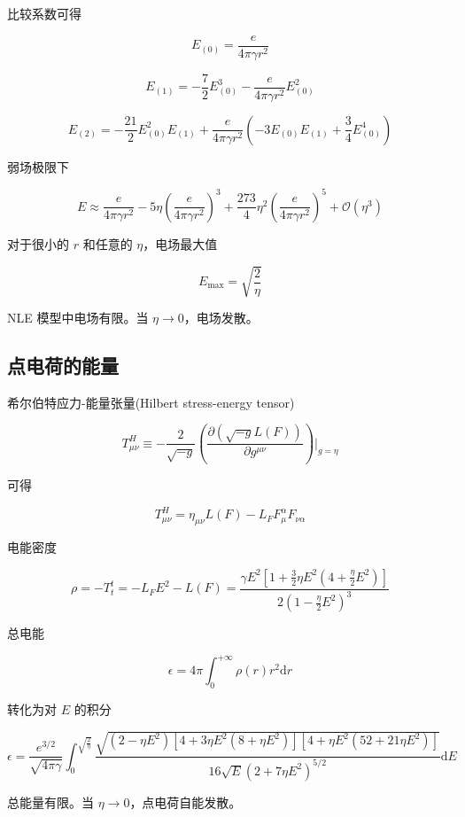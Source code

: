 \documentclass[9pt, dvipsnames]{beamer} %
\begin{document}
\begin{frame}
    比较系数可得
    
    $$
    E_{(0)}
    =\frac{e }{4\pi\gamma r^2 }
    $$
    
    $$
    E_{(1)} 
    =-\frac{7 }{2 } E_{(0)}^3 - \frac{e }{4\pi \gamma r^2 } E_{(0)}^2
    $$
    
    $$
    E_{(2)}
    =-\frac{21 }{2 } E_{(0)}^2 E_{(1)} + \frac{e }{4\pi\gamma r^2 } \left(-3E_{(0)}E_{(1)} + \frac{3 }{4 } E_{(0)}^4 \right)
    $$
    
    弱场极限下
    
    $$
    E
    \approx \frac{e }{4\pi\gamma r^2 } - 5\eta\left(\frac{e }{4\pi\gamma r^2 }  \right)^3 + \frac{273 }{4 } \eta^2\left(\frac{e }{4\pi\gamma r^2 }  \right)^5 + \mathcal{O}\left(\eta^3 \right)
    $$
    
    对于很小的 $r$ 和任意的 $\eta$，电场最大值
    
    $$
    E_{\max}
    =\sqrt{\frac{2 }{\eta } }
    $$
    
    NLE 模型中电场有限。当 $\eta\to 0 $，电场发散。
    
\end{frame}

\subsection{点电荷的能量}

\begin{frame}
    希尔伯特应力-能量张量(Hilbert stress-energy tensor)

    $$
    T_{\mu\nu}^H
    \equiv -\frac{2 }{\sqrt{-g} } \left(\frac{\partial \left(\sqrt{-g}L(F) \right) }{\partial g^{\mu\nu} }  \right)\bigg|_{g=\eta}
    $$
    
    可得
    
    $$
    T_{\mu\nu}^H
    =\eta_{\mu\nu}L(F) - L_FF_\mu^\alpha F_{\nu\alpha}
    $$
    
    电能密度
    
    $$
    \rho
    =-T_t^t
    =-L_FE^2-L(F)
    =\frac{\gamma E^2\left[1+\frac{3 }{2 } \eta E^2 \left(4+\frac{\eta }{2 } E^2 \right) \right] }{2\left(1-\frac{\eta }{2 } E^2 \right)^3 } 
    $$
    
    总电能
    
    $$
    \epsilon
    =4\pi\int_{0}^{+\infty} \rho(r)r^2\mathrm{d}r
    $$
    
    转化为对 $E $ 的积分
    
    $$
    \epsilon
    =\frac{e^{3/2} }{\sqrt{4\pi\gamma} } \int_{0}^{\sqrt{\frac{2 }{\eta  } }} \frac{\sqrt{\left(2-\eta E^2 \right)\left[4+3\eta E^2\left(8+\eta E^2 \right) \right]\left[4+\eta E^2\left(52+21\eta E^2 \right) \right]} }{16\sqrt{E}\left(2+7\eta E^2 \right)^{5/2} } \mathrm{d}E
    $$
    
    总能量有限。当 $\eta\to 0$，点电荷自能发散。
\end{frame}
\end{document}
